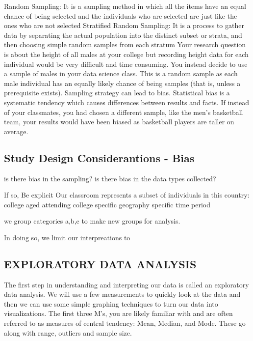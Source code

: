 \documentclass[
]{book}
\begin{document}
Random Sampling: It is a sampling method in which all the items have an equal chance of being selected and the individuals who are selected are just like the ones who are not selected
Stratified Random Sampling: It is a process to gather data by separating the actual population into the distinct subset or strata, and then choosing simple random samples from each stratum Your research question is about the height of all males at your college but recording height data for each individual would be very difficult and time consuming. You instead decide to use a sample of males in your data science class. This is a random sample as each male individual has an equally likely chance of being samples (that is, unless a prerequisite exists).
Sampling strategy can lead to bias. Statistical bias is a systematic tendency which causes differences between results and facts. If instead of your classmates, you had chosen a different sample, like the men's basketball team, your results would have been biased as basketball players are taller on average.

\hypertarget{study-design-considerantions---bias}{%
\subsection{Study Design Considerantions - Bias}\label{study-design-considerantions---bias}}

is there bias in the sampling?
is there bias in the data types collected?

If so, Be explicit
Our classroom represents a subset of individuals in this country:
college aged
attending college
specific geography
specific time period

we group categories a,b,c to make new groups for analysis.

In doing so, we limit our interpreations to \_\_\_\_\_

\hypertarget{exploratory-data-analysis}{%
\subsection{EXPLORATORY DATA ANALYSIS}\label{exploratory-data-analysis}}

The first step in understanding and interpreting our data is called an exploratory data analysis. We will use a few measurements to quickly look at the data and then we can use some simple graphing techniques to turn our data into visualizations. The first three M's, you are likely familiar with and are often referred to as measures of central tendency: Mean, Median, and Mode.
These go along with range, outliers and sample size.
\end{document}
